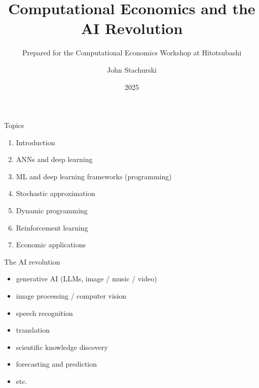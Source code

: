 


\title{Computational Economics and the AI Revolution}
\subtitle{Prepared for the Computational Economics Workshop at Hitotsubashi}


\author{John Stachurski}


\date{2025}




\begin{frame}
  \titlepage
\end{frame}



\begin{frame}{Topics}

    \begin{enumerate}
        \item Introduction
        \vspace{0.5em}
        \item ANNs and deep learning
        \vspace{0.5em}
        \item ML and deep learning frameworks (programming)
        \vspace{0.5em}
        \item Stochastic approximation
        \vspace{0.5em}
        \item Dynamic programming
        \vspace{0.5em}
        \item Reinforcement learning
        \vspace{0.5em}
        \item Economic applications
    \end{enumerate}

\end{frame}



\begin{frame}{The AI revolution}


    \begin{itemize}
        \item generative AI  (LLMs, image / music / video)
        \vspace{0.5em}
        \item image processing / computer vision
        \vspace{0.5em}
        \item speech recognition
        \vspace{0.5em}
        \item translation
        \vspace{0.5em}
        \item scientific knowledge discovery
        \vspace{0.5em}
        \item forecasting and prediction 
        \vspace{0.5em}
        \item etc.
    \end{itemize}

    
\end{frame}

